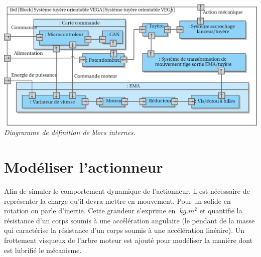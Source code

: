 \documentclass[10pt,fleqn]{article} %
\begin{document}
\begin{multicols}{2}
\begin{center}
\includegraphics[width=.95\linewidth]{images/fig_04}
\textit{Diagramme de définition de blocs internes.}
\end{center}
%
%
%
%
%
%
%
%

\section*{Modéliser l'actionneur\\}



 



Afin de simuler le comportement dynamique de l'actionneur, il est nécessaire de représenter la charge qu'il devra mettre en mouvement. Pour un solide en rotation on parle d'inertie. Cette grandeur s'exprime en $\SI{}{kg. m^2}$ et quantifie la résistance d'un corps soumis à une accélération angulaire (le pendant de la masse qui caractérise la résistance d'un corps soumis à une accélération linéaire).
Un frottement visqueux de l'arbre moteur est ajouté %
pour modéliser la manière dont est lubrifié le mécanisme.


\end{multicols}
\end{document}
